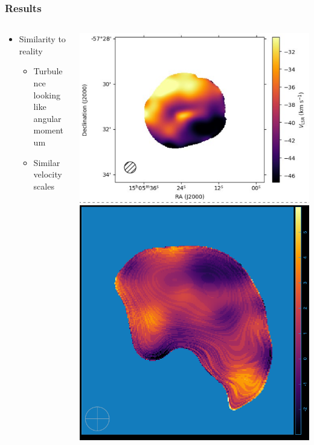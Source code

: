 \documentclass[aspectratio=169,compress]{beamer}
\begin{document}
\begin{frame}
  \frametitle{Results}
  \begin{columns}
    \begin{column}{0.5\linewidth}
      \begin{itemize}
        \item Similarity to reality
          \begin{itemize}
            \item Turbulence looking like angular momentum
            \item Similar velocity scales
          \end{itemize}
      \end{itemize}
    \end{column}
    \begin{column}{0.5\linewidth}
      \includegraphics[width=0.6\linewidth]{figures/smallrealVLSR.png}
      \includegraphics[width=0.4\linewidth]{figures/standard_M1.png}
    \end{column}
  \end{columns}
\end{frame}
\end{document}
